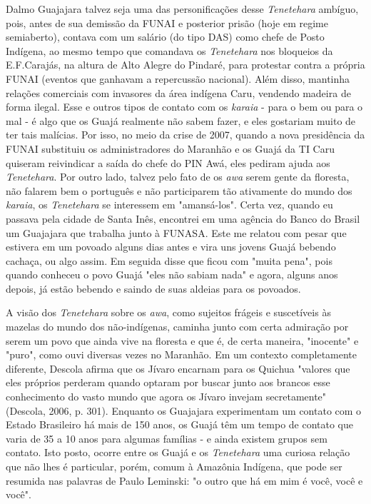 Dalmo Guajajara talvez seja uma das personificações desse
\emph{Tenetehara} ambíguo, pois, antes de sua demissão da FUNAI e
posterior prisão (hoje em regime semiaberto), contava com um salário (do
tipo DAS) como chefe de Posto Indígena, ao mesmo tempo que comandava os
\emph{Tenetehara} nos bloqueios da E.F.Carajás, na altura de Alto Alegre
do Pindaré, para protestar contra a própria FUNAI (eventos que ganhavam
a repercussão nacional). Além disso, mantinha relações comerciais com
invasores da área indígena Caru, vendendo madeira de forma ilegal. Esse
e outros tipos de contato com os \emph{karaia} - para o bem ou para o
mal - é algo que os Guajá realmente não sabem fazer, e eles gostariam
muito de ter tais malícias. Por isso, no meio da crise de 2007, quando a
nova presidência da FUNAI substituiu os administradores do Maranhão e os
Guajá da TI Caru quiseram reivindicar a saída do chefe do PIN Awá, eles
pediram ajuda aos \emph{Tenetehara}. Por outro lado, talvez pelo fato de
os \emph{awa} serem gente da floresta, não falarem bem o português e não
participarem tão ativamente do mundo dos \emph{karaia}, os
\emph{Tenetehara} se interessem em "amansá-los". Certa vez, quando eu
passava pela cidade de Santa Inês, encontrei em uma agência do Banco do
Brasil um Guajajara que trabalha junto à FUNASA. Este me relatou com
pesar que estivera em um povoado alguns dias antes e vira uns jovens
Guajá bebendo cachaça, ou algo assim. Em seguida disse que ficou com
"muita pena", pois quando conheceu o povo Guajá "eles não sabiam nada" e
agora, alguns anos depois, já estão bebendo e saindo de suas aldeias
para os povoados.

A visão dos \emph{Tenetehara} sobre os \emph{awa}, como sujeitos frágeis
e suscetíveis às mazelas do mundo dos não-indígenas, caminha junto com
certa admiração por serem um povo que ainda vive na floresta e que é, de
certa maneira, "inocente" e "puro", como ouvi diversas vezes no
Maranhão. Em um contexto completamente diferente, Descola afirma que os
Jívaro encarnam para os Quichua "valores que eles próprios perderam
quando optaram por buscar junto aos brancos esse conhecimento do vasto
mundo que agora os Jívaro invejam secretamente" (Descola, 2006, p. 301).
Enquanto os Guajajara experimentam um contato com o Estado Brasileiro há
mais de 150 anos, os Guajá têm um tempo de contato que varia de 35 a 10
anos para algumas famílias - e ainda existem grupos sem contato. Isto
posto, ocorre entre os Guajá e os \emph{Tenetehara} uma curiosa relação
que não lhes é particular, porém, comum à Amazônia Indígena, que pode
ser resumida nas palavras de Paulo Leminski: "o outro que há em mim é
você, você e você".
